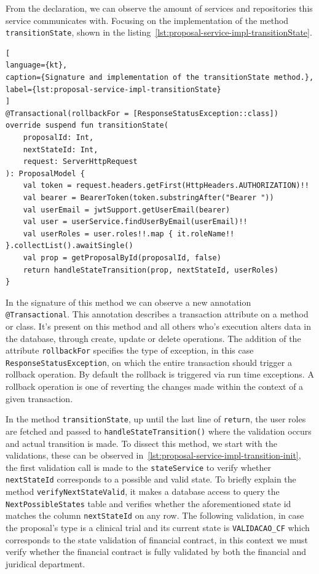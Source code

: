 From the declaration, we can observe the amount of services and repositories this service communicates with.
Focusing on the implementation of the method \lstinline{transitionState}, shown in the listing~\ref{lst:proposal-service-impl-transitionState}. 

\begin{lstlisting}[
language={kt},
caption={Signature and implementation of the transitionState method.},
label={lst:proposal-service-impl-transitionState}
]
@Transactional(rollbackFor = [ResponseStatusException::class])
override suspend fun transitionState(
    proposalId: Int,
    nextStateId: Int,
    request: ServerHttpRequest
): ProposalModel {
    val token = request.headers.getFirst(HttpHeaders.AUTHORIZATION)!!
    val bearer = BearerToken(token.substringAfter("Bearer "))
    val userEmail = jwtSupport.getUserEmail(bearer)
    val user = userService.findUserByEmail(userEmail)!!
    val userRoles = user.roles!!.map { it.roleName!! }.collectList().awaitSingle()
    val prop = getProposalById(proposalId, false)
    return handleStateTransition(prop, nextStateId, userRoles)
}    
\end{lstlisting}

In the signature of this method we can observe a new annotation \lstinline{@Transactional}. This annotation describes a transaction attribute on a method or class. 
It's present on this method and all others who's execution alters data in the database, through create, update or delete operations. The addition of the attribute \lstinline{rollbackFor} specifies the type of exception, in this case \lstinline{ResponseStatusException}, on which the entire transaction should trigger a rollback operation. By default the rollback is triggered via run time exceptions. A rollback operation is one of reverting the changes made within the context of a given transaction.

In the method \lstinline{transitionState}, up until the last line of \lstinline{return}, the user roles are fetched and passed to \lstinline{handleStateTransition()} where the validation occurs and actual transition is made. 
To dissect this method, we start with the validations, these can be observed in~\ref{lst:proposal-service-impl-transition-init}, the first validation call is made to the \lstinline{stateService} to verify whether \lstinline{nextStateId} corresponds to a possible and valid state. To briefly explain the method \lstinline{verifyNextStateValid}, it makes a database access to query the \lstinline{NextPossibleStates} table and verifies whether the aforementioned state id matches the column \lstinline{nextStateId} on any row.
The following validation, in case the proposal's type is a clinical trial and its current state is \lstinline{VALIDACAO_CF} which corresponds to the state validation of financial contract, in this context we must verify whether the financial contract is fully validated by both the financial and juridical department. 

